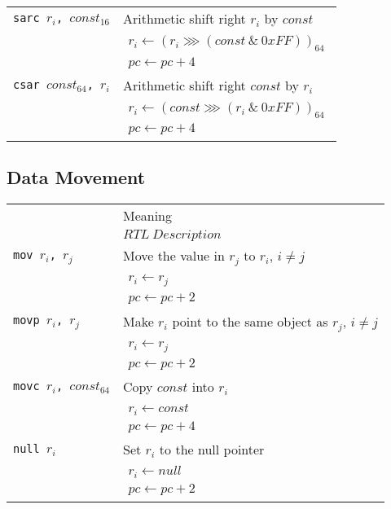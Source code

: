 \begin{longtable}{|p{10em}|p{30em}|}
			\hline
			\texttt{sarc $r_i$, $const_{16}$} & Arithmetic shift right $r_i$ by $const$ \\*
			& $\begin{array}{lcl}
			r_i \leftarrow (r_i \ggg (const ~\&~ 0xFF))_{64} \\
			pc \leftarrow pc + 4
			\end{array}$ \\
			\hline
			\texttt{csar $const_{64}$, $r_i$} & Arithmetic shift right $const$ by $r_i$ \\*
			& $\begin{array}{lcl}
			r_i \leftarrow (const \ggg (r_i ~\&~ 0xFF))_{64} \\
			pc \leftarrow pc + 4
			\end{array}$ \\
		\end{longtable}
		
		\subsection{Data Movement}
		\begin{longtable}{|p{10em}|p{30em}|}
			\hline \endfoot
			\hline 
			\multirow{2}{*}{Instruction} & Meaning \\*
			& $RTL~Description$ \\
			\hline \endhead
			\texttt{mov $r_i$, $r_j$} & Move the value in $r_j$ to $r_i$, $i \neq j$ \\*
			& $\begin{array}{lcl}
			r_i \leftarrow r_j \\
			pc \leftarrow pc + 2
			\end{array}$ \\
			\hline
			\texttt{movp $r_i$, $r_j$} & Make $r_i$ point to the same object as $r_j$, $i \neq j$ \\*
			& $\begin{array}{lcl}
			r_i \leftarrow r_j \\
			pc \leftarrow pc + 2
			\end{array}$ \\
			\hline
			\texttt{movc $r_i$, $const_{64}$} & Copy $const$ into $r_i$ \\*
			& $\begin{array}{lcl}
			r_i \leftarrow const \\
			pc \leftarrow pc + 4
			\end{array}$ \\
			\hline
			\texttt{null $r_i$} & Set $r_i$ to the null pointer \\*
			& $\begin{array}{lcl}
			r_i \leftarrow null \\
			pc \leftarrow pc + 2
			\end{array}$ \\
			\hline
		\end{longtable}
		
